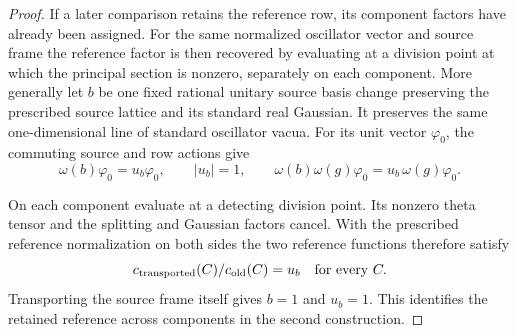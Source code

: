 \begin{proof}
If a later comparison retains the reference row, its component
factors have already been assigned. For the same normalized
oscillator vector and source frame the reference factor is
then recovered by evaluating at a division point at which the
principal section is nonzero, separately on each component.
More generally let \(b\) be one fixed rational unitary source
basis change preserving the prescribed source lattice and its
standard real Gaussian. It preserves the same one-dimensional
line of standard oscillator vacua. For its unit vector
\(\varphi_0\), the commuting source and row actions give
\[
 \omega(b)\varphi_0=u_b\varphi_0,\qquad |u_b|=1,\qquad
 \omega(b)\omega(g)\varphi_0=u_b\,\omega(g)\varphi_0 .
\]

On each component evaluate at a detecting division point. Its
nonzero theta tensor and the splitting and Gaussian factors
cancel. With the prescribed reference normalization on both
sides the two reference functions therefore satisfy
\[
     c_{\rm transported}(C)/c_{\rm old}(C)=u_b
                                  \quad\text{for every }C .
\]
Transporting the source frame itself gives \(b=1\) and \(u_b=1\).
This identifies the retained reference across components in the
second construction.
\end{proof}

